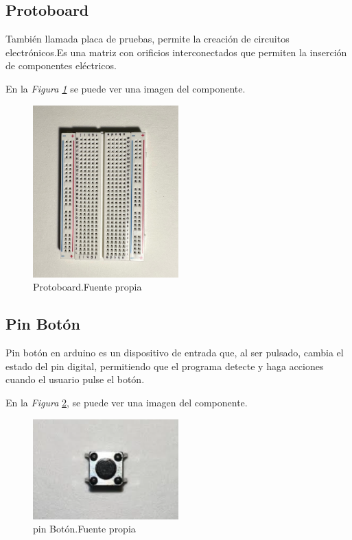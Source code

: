 \subsection{Protoboard}
También llamada placa de pruebas, permite la creación de circuitos electrónicos.Es una matriz con orificios interconectados que permiten la inserción de componentes eléctricos. 

En la \textit{Figura \ref{fig:Protoboard} } se puede ver una imagen del componente.
\begin{figure}[h]
        \centering
        \includegraphics[angle=90,width=0.5\textwidth]{img/Protoboard.png}
        \caption{Protoboard.Fuente propia}
        \label{fig:Protoboard}
    \end{figure}

\subsection{Pin Botón}
Pin botón en arduino es un dispositivo de entrada que, al ser pulsado, cambia el estado del pin digital, permitiendo que el programa detecte y haga acciones cuando el usuario pulse el botón.

En la \textit{Figura} \ref{fig:pinBoton}, se puede ver una imagen del componente.

\begin{figure}[h]
        \centering
        \includegraphics[width=0.5\textwidth]{img/pinBoton.png}
        \caption{pin Botón.Fuente propia}
        \label{fig:pinBoton}
    \end{figure}
